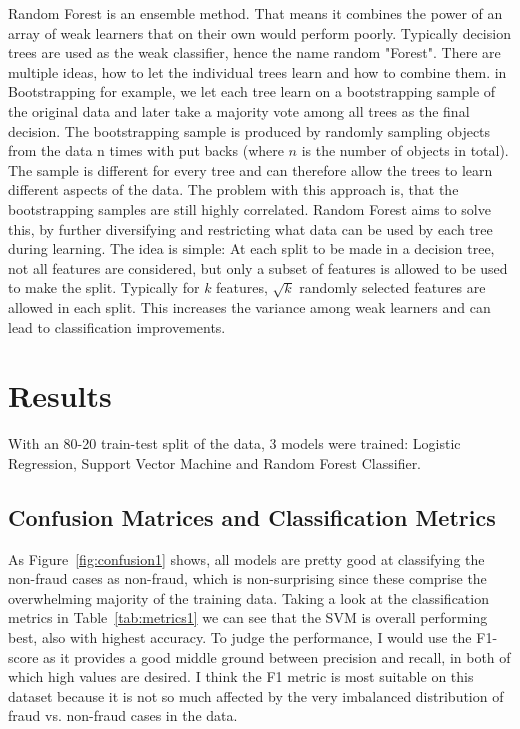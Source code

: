 \documentclass[utf8x]{ctexart}
\begin{document}
Random Forest is an ensemble method. That means it combines the power of an array of weak learners that on their own would perform poorly. Typically decision trees are used as the weak classifier, hence the name random "Forest". There are multiple ideas, how to let the individual trees learn and how to combine them. in Bootstrapping for example, we let each tree learn on a bootstrapping sample of the original data and later take a majority vote among all trees as the final decision. The bootstrapping sample is produced by randomly sampling objects from the data n times with put backs (where $n$ is the number of objects in total). The sample is different for every tree and can therefore allow the trees to learn different aspects of the data. The problem with this approach is, that the bootstrapping samples are still highly correlated. Random Forest aims to solve this, by further diversifying and restricting what data can be used by each tree during learning. The idea is simple: At each split to be made in a decision tree, not all features are considered, but only a subset of features is allowed to be used to make the split. Typically for $k$ features, $\sqrt{k}$ randomly selected features are allowed in each split. This increases the variance among weak learners and can lead to classification improvements.

\section{Results}

With an 80-20 train-test split of the data, 3 models were trained: Logistic Regression, Support Vector Machine and Random Forest Classifier.

\subsection{Confusion Matrices and Classification Metrics}
As Figure~\ref{fig:confusion1} shows, all models are pretty good at classifying the non-fraud cases as non-fraud, which is non-surprising since these comprise the overwhelming majority of the training data.
Taking a look at the classification metrics in Table~\ref{tab:metrics1} we can see that the SVM is overall performing best, also with highest accuracy. To judge the performance, I would use the F1-score as it provides a good middle ground between precision and recall, in both of which high values are desired. I think the F1 metric is most suitable on this dataset because it is not so much affected by the very imbalanced distribution of fraud vs. non-fraud cases in the data.
\end{document}
